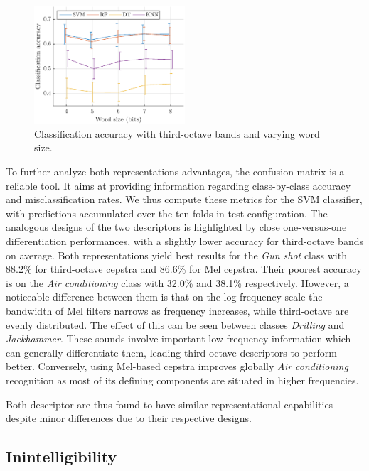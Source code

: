 \documentclass[sensors,article,submit,moreauthors,pdftex,10pt,a4paper]{mdpi}
\providecommand{\DIFaddbegin}{} %
\providecommand{\DIFaddend}{} %
\providecommand{\DIFdelbegin}{} %
\providecommand{\DIFdelend}{} %
\begin{document}
\begin{figure}[htbp]
	\centering
		\includegraphics[width=0.5\textwidth]{figures/class_tob_q.eps}
	\caption{Classification accuracy with third-octave bands and varying word size.}
	\label{fig:class_tob_q}
\end{figure}

To further analyze both representations advantages, the confusion matrix is a reliable tool. It aims at providing information regarding class-by-class accuracy and misclassification rates. We thus compute these metrics for the SVM classifier, with predictions accumulated over the ten folds in test configuration. The analogous designs of the two descriptors is highlighted by close one-versus-one differentiation performances, with a slightly lower accuracy for third-octave bands on average. Both representations yield best results for the \textit{Gun shot} class with 88.2\% for third-octave cepstra and 86.6\% for Mel cepstra. Their poorest accuracy is on the \textit{Air conditioning} class with 32.0\% and 38.1\% respectively. However, a noticeable difference between them is that on the log-frequency scale the bandwidth of Mel filters narrows as frequency increases, while third-octave are evenly distributed. The effect of this can be seen between classes \textit{Drilling} and \textit{Jackhammer}. These sounds involve important low-frequency information which can generally differentiate them, leading third-octave descriptors to perform better. Conversely, using Mel-based cepstra improves globally \textit{Air conditioning} recognition as most of its defining components are situated in higher frequencies.
\DIFdelbegin %
\DIFdelend 

Both descriptor are thus found to have similar representational capabilities despite minor differences due to their respective designs.


\subsection{Inintelligibility} \DIFaddbegin \label{sec:inintelligibility_r}
\DIFaddend 
\end{document}
